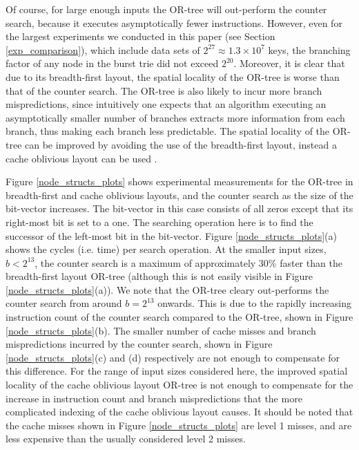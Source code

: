 \documentclass[]{acmtrans2m}
\begin{document}
Of course, for large enough inputs the OR-tree will out-perform the counter search, because it executes asymptotically
fewer instructions. However, even for the largest experiments we conducted in 
this paper (see Section \ref{exp_comparison}), which include data sets of $2^{27} \approx 1.3 \times 10^7$ keys, the 
branching factor of any node in the burst trie did not exceed $2^{20}$. 
Moreover, it is clear that due to its breadth-first layout, the spatial locality of the OR-tree is worse than 
that of the counter search. The OR-tree is also likely to incur more branch mispredictions, since intuitively
one expects that an algorithm executing an asymptotically smaller number of branches extracts more information from
each branch, thus making each branch less predictable. 
The spatial locality of the OR-tree can be improved by avoiding the use of the breadth-first layout, instead
a cache oblivious layout can be used \cite{Bender+00,Brodal+02}.

Figure \ref{node_structs_plots} shows experimental measurements for the OR-tree in breadth-first and cache oblivious layouts, and the counter search
as the size of the bit-vector increases. The bit-vector in this case consists of all zeros
except that its right-most bit is set to a one. The searching operation here is to find the successor of the left-most
bit in the bit-vector. Figure \ref{node_structs_plots}(a) shows the cycles (i.e. time) per search operation. 
At the smaller input sizes, $b < 2^{13}$, the counter search is a maximum of approximately 30\% faster than the breadth-first
layout OR-tree (although this is not easily visible in Figure \ref{node_structs_plots}(a)). We note that
the OR-tree cleary out-performs the counter search from around $b = 2^{13}$ onwards.  This is due to the rapidly increasing
instruction count of the counter search compared to the OR-tree, shown in Figure \ref{node_structs_plots}(b). The 
smaller number of cache misses and branch mispredictions incurred by the counter search, shown in Figure \ref{node_structs_plots}(c) and (d) respectively are not 
enough to compensate for this difference. For the range of input sizes considered here, the improved spatial locality of the cache oblivious layout OR-tree
is not enough to compensate for the increase in instruction count and branch mispredictions that the more complicated 
indexing of the cache oblivious layout causes. It should be noted that the cache misses shown in Figure \ref{node_structs_plots} are level 1 misses, and are
less expensive than the usually considered level 2 misses.
\end{document}
